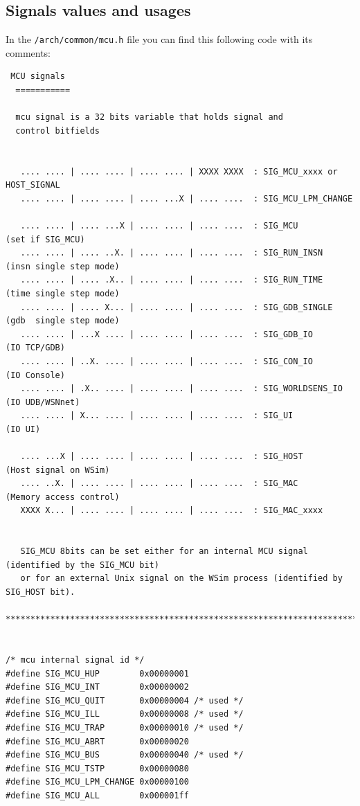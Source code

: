 \documentclass[a4paper,10pt]{report}
\begin{document}
\subsection{Signals values and usages}

In the \verb$/arch/common/mcu.h$ file you can find this following code with its comments:

\begin{verbatim}
 MCU signals
  ===========

  mcu signal is a 32 bits variable that holds signal and 
  control bitfields

 
   .... .... | .... .... | .... .... | XXXX XXXX  : SIG_MCU_xxxx or HOST_SIGNAL
   .... .... | .... .... | .... ...X | .... ....  : SIG_MCU_LPM_CHANGE
  
   .... .... | .... ...X | .... .... | .... ....  : SIG_MCU          (set if SIG_MCU)
   .... .... | .... ..X. | .... .... | .... ....  : SIG_RUN_INSN     (insn single step mode)
   .... .... | .... .X.. | .... .... | .... ....  : SIG_RUN_TIME     (time single step mode)
   .... .... | .... X... | .... .... | .... ....  : SIG_GDB_SINGLE   (gdb  single step mode)
   .... .... | ...X .... | .... .... | .... ....  : SIG_GDB_IO       (IO TCP/GDB)
   .... .... | ..X. .... | .... .... | .... ....  : SIG_CON_IO       (IO Console)
   .... .... | .X.. .... | .... .... | .... ....  : SIG_WORLDSENS_IO (IO UDB/WSNnet)
   .... .... | X... .... | .... .... | .... ....  : SIG_UI           (IO UI)
  
   .... ...X | .... .... | .... .... | .... ....  : SIG_HOST         (Host signal on WSim)
   .... ..X. | .... .... | .... .... | .... ....  : SIG_MAC          (Memory access control)
   XXXX X... | .... .... | .... .... | .... ....  : SIG_MAC_xxxx


   SIG_MCU 8bits can be set either for an internal MCU signal (identified by the SIG_MCU bit)
   or for an external Unix signal on the WSim process (identified by SIG_HOST bit).

**********************************************************************************************/


/* mcu internal signal id */
#define SIG_MCU_HUP        0x00000001
#define SIG_MCU_INT        0x00000002
#define SIG_MCU_QUIT       0x00000004 /* used */
#define SIG_MCU_ILL        0x00000008 /* used */
#define SIG_MCU_TRAP       0x00000010 /* used */
#define SIG_MCU_ABRT       0x00000020
#define SIG_MCU_BUS        0x00000040 /* used */
#define SIG_MCU_TSTP       0x00000080
#define SIG_MCU_LPM_CHANGE 0x00000100
#define SIG_MCU_ALL        0x000001ff


\end{verbatim}
\end{document}
